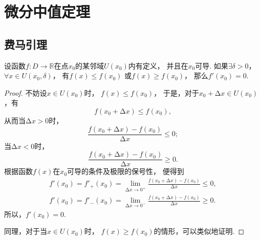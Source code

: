 \section{微分中值定理}
\subsection{费马引理}
\begin{lemma}[费马引理]\label{theorem:微分中值定理.费马引理}
设函数\(f\colon D\to\mathbb{R}\)在点\(x_0\)的某邻域\(U(x_0)\)内有定义，
并且在\(x_0\)可导.
如果\(\exists\delta>0\)，
\(\forall x \in U(x_0,\delta)\)，
有\(f(x) \leq f(x_0)\)
或\(f(x) \geq f(x_0)\)，
那么\(f'(x_0) = 0\).
\begin{proof}
不妨设\(x \in U(x_0)\)时，
\(f(x) \leq f(x_0)\)，
于是，对于\(x_0 + \increment x \in U(x_0)\)，有\begin{equation*}
    f(x_0 + \increment x) \leq f(x_0),
\end{equation*}
从而当\(\increment x > 0\)时，\begin{equation*}
    \frac{f(x_0 + \increment x) - f(x_0)}{\increment x} \leq 0;
\end{equation*}
当\(\increment x < 0\)时，\begin{equation*}
    \frac{f(x_0 + \increment x) - f(x_0)}{\increment x} \geq 0.
\end{equation*}
根据函数\(f(x)\)在\(x_0\)可导的条件及极限的保号性，
便得到\begin{gather*}
    f'(x_0) = f'_+(x_0)
    = \lim_{\increment x\to0^+}
    \frac{f(x_0 + \increment x) - f(x_0)}{\increment x} \leq 0, \\
    f'(x_0) = f'_-(x_0)
    = \lim_{\increment x\to0^-}
    \frac{f(x_0 + \increment x) - f(x_0)}{\increment x} \geq 0.
\end{gather*}
所以，\(f'(x_0) = 0\).

同理，对于当\(x \in U(x_0)\)时，
\(f(x) \geq f(x_0)\)的情形，可以类似地证明.
\end{proof}
\end{lemma}

